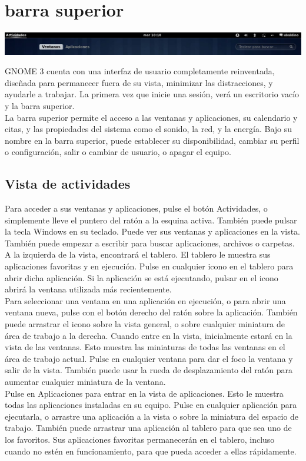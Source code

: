 \chapter{barra superior}
\begin{center}
\includegraphics[scale=0.45]{img/barra2.png} 
\end{center}
GNOME 3 cuenta con una interfaz de usuario completamente reinventada, diseñada para permanecer fuera de su vista, minimizar las distracciones, y ayudarle a trabajar. La primera vez que inicie una sesión, verá un escritorio vacío y la barra superior.\\

La barra superior permite el acceso a las ventanas y aplicaciones, su calendario y citas, y las propiedades del sistema como el sonido, la red, y la energía. Bajo su nombre en la barra superior, puede establecer su disponibilidad, cambiar su perfil o configuración, salir o cambiar de usuario, o apagar el equipo.
\section{Vista de actividades}
Para acceder a sus ventanas y aplicaciones, pulse el botón Actividades, o simplemente lleve el puntero del ratón a la esquina activa. También puede pulsar la tecla Windows en su teclado. Puede ver sus ventanas y aplicaciones en la vista. También puede empezar a escribir para buscar aplicaciones, archivos o carpetas.\\

A la izquierda de la vista, encontrará el tablero. El tablero le muestra sus aplicaciones favoritas y en ejecución. Pulse en cualquier icono en el tablero para abrir dicha aplicación. Si la aplicación se está ejecutando, pulsar en el icono abrirá la ventana utilizada ​​más recientemente.\\
Para seleccionar una ventana en una aplicación en ejecución, o para abrir una ventana nueva, pulse con el botón derecho del ratón sobre la aplicación. También puede arrastrar el icono sobre la vista general, o sobre cualquier miniatura de área de trabajo a la derecha.
Cuando entre en la vista, inicialmente estará en la vista de las ventanas. Esto muestra las miniaturas de todas las ventanas en el área de trabajo actual. Pulse en cualquier ventana para dar el foco la ventana y salir de la vista. También puede usar la rueda de desplazamiento del ratón para aumentar cualquier miniatura de la ventana.\\
Pulse en Aplicaciones para entrar en la vista de aplicaciones. Esto le muestra todas las aplicaciones instaladas en su equipo. Pulse en cualquier aplicación para ejecutarla, o arrastre una aplicación a la vista o sobre la miniatura del espacio de trabajo. También puede arrastrar una aplicación al tablero para que sea uno de los favoritos. Sus aplicaciones favoritas permanecerán en el tablero, incluso cuando no estén en funcionamiento, para que pueda acceder a ellas rápidamente.
